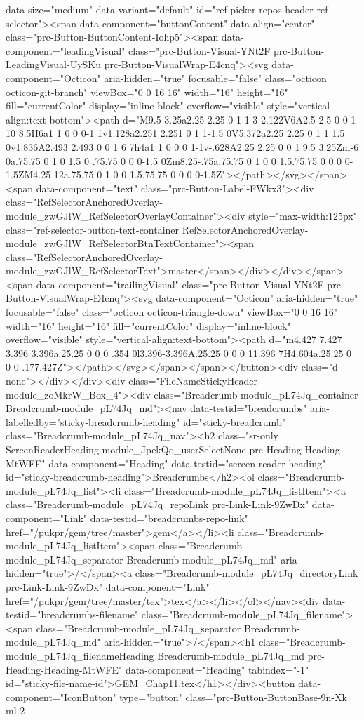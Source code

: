 data-size="medium" data-variant="default" id="ref-picker-repos-header-ref-selector"><span data-component="buttonContent" data-align="center" class="prc-Button-ButtonContent-Iohp5"><span data-component="leadingVisual" class="prc-Button-Visual-YNt2F prc-Button-LeadingVisual-UySKu prc-Button-VisualWrap-E4cnq"><svg data-component="Octicon" aria-hidden="true" focusable="false" class="octicon octicon-git-branch" viewBox="0 0 16 16" width="16" height="16" fill="currentColor" display="inline-block" overflow="visible" style="vertical-align:text-bottom"><path d="M9.5 3.25a2.25 2.25 0 1 1 3 2.122V6A2.5 2.5 0 0 1 10 8.5H6a1 1 0 0 0-1 1v1.128a2.251 2.251 0 1 1-1.5 0V5.372a2.25 2.25 0 1 1 1.5 0v1.836A2.493 2.493 0 0 1 6 7h4a1 1 0 0 0 1-1v-.628A2.25 2.25 0 0 1 9.5 3.25Zm-6 0a.75.75 0 1 0 1.5 0 .75.75 0 0 0-1.5 0Zm8.25-.75a.75.75 0 1 0 0 1.5.75.75 0 0 0 0-1.5ZM4.25 12a.75.75 0 1 0 0 1.5.75.75 0 0 0 0-1.5Z"></path></svg></span><span data-component="text" class="prc-Button-Label-FWkx3"><div class="RefSelectorAnchoredOverlay-module_zwGJlW_RefSelectorOverlayContainer"><div style="max-width:125px" class="ref-selector-button-text-container RefSelectorAnchoredOverlay-module_zwGJlW_RefSelectorBtnTextContainer"><span class="RefSelectorAnchoredOverlay-module_zwGJlW_RefSelectorText">master</span></div></div></span><span data-component="trailingVisual" class="prc-Button-Visual-YNt2F prc-Button-VisualWrap-E4cnq"><svg data-component="Octicon" aria-hidden="true" focusable="false" class="octicon octicon-triangle-down" viewBox="0 0 16 16" width="16" height="16" fill="currentColor" display="inline-block" overflow="visible" style="vertical-align:text-bottom"><path d="m4.427 7.427 3.396 3.396a.25.25 0 0 0 .354 0l3.396-3.396A.25.25 0 0 0 11.396 7H4.604a.25.25 0 0 0-.177.427Z"></path></svg></span></span></button><div class="d-none"></div></div><div class="FileNameStickyHeader-module_zoMkrW_Box_4"><div class="Breadcrumb-module_pL74Jq_container Breadcrumb-module_pL74Jq_md"><nav data-testid="breadcrumbs" aria-labelledby="sticky-breadcrumb-heading" id="sticky-breadcrumb" class="Breadcrumb-module_pL74Jq_nav"><h2 class="sr-only ScreenReaderHeading-module_JpekQq_userSelectNone prc-Heading-Heading-MtWFE" data-component="Heading" data-testid="screen-reader-heading" id="sticky-breadcrumb-heading">Breadcrumbs</h2><ol class="Breadcrumb-module_pL74Jq_list"><li class="Breadcrumb-module_pL74Jq_listItem"><a class="Breadcrumb-module_pL74Jq_repoLink prc-Link-Link-9ZwDx" data-component="Link" data-testid="breadcrumbs-repo-link" href="/pukpr/gem/tree/master">gem</a></li><li class="Breadcrumb-module_pL74Jq_listItem"><span class="Breadcrumb-module_pL74Jq_separator Breadcrumb-module_pL74Jq_md" aria-hidden="true">/</span><a class="Breadcrumb-module_pL74Jq_directoryLink prc-Link-Link-9ZwDx" data-component="Link" href="/pukpr/gem/tree/master/tex">tex</a></li></ol></nav><div data-testid="breadcrumbs-filename" class="Breadcrumb-module_pL74Jq_filename"><span class="Breadcrumb-module_pL74Jq_separator Breadcrumb-module_pL74Jq_md" aria-hidden="true">/</span><h1 class="Breadcrumb-module_pL74Jq_filenameHeading Breadcrumb-module_pL74Jq_md prc-Heading-Heading-MtWFE" data-component="Heading" tabindex="-1" id="sticky-file-name-id">GEM_Chap11.tex</h1></div><button data-component="IconButton" type="button" class="prc-Button-ButtonBase-9n-Xk ml-2 